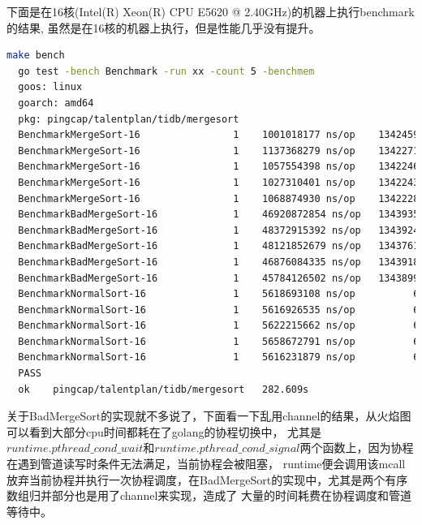 \documentclass[UTF8]{ctexart}
\begin{document}
下面是在16核(Intel(R) Xeon(R) CPU E5620  @ 2.40GHz)的机器上执行benchmark的结果, 虽然是在16核的机器上执行，但是性能几乎没有提升。
\begin{lstlisting}[language=bash]
  make bench
  go test -bench Benchmark -run xx -count 5 -benchmem
  goos: linux
  goarch: amd64
  pkg: pingcap/talentplan/tidb/mergesort
  BenchmarkMergeSort-16       	       1	1001018177 ns/op	134245904 B/op	      79 allocs/op
  BenchmarkMergeSort-16       	       1	1137368279 ns/op	134227152 B/op	      29 allocs/op
  BenchmarkMergeSort-16       	       1	1057554398 ns/op	134224624 B/op	      29 allocs/op
  BenchmarkMergeSort-16       	       1	1027310401 ns/op	134224336 B/op	      30 allocs/op
  BenchmarkMergeSort-16       	       1	1068874930 ns/op	134222896 B/op	      27 allocs/op
  BenchmarkBadMergeSort-16    	       1	46920872854 ns/op	134393560 B/op	     167 allocs/op
  BenchmarkBadMergeSort-16    	       1	48372915392 ns/op	134392440 B/op	     161 allocs/op
  BenchmarkBadMergeSort-16    	       1	48121852679 ns/op	134376152 B/op	     102 allocs/op
  BenchmarkBadMergeSort-16    	       1	46876084335 ns/op	134391896 B/op	     155 allocs/op
  BenchmarkBadMergeSort-16    	       1	45784126502 ns/op	134389944 B/op	     135 allocs/op
  BenchmarkNormalSort-16      	       1	5618693108 ns/op	      64 B/op	       2 allocs/op
  BenchmarkNormalSort-16      	       1	5616926535 ns/op	      64 B/op	       2 allocs/op
  BenchmarkNormalSort-16      	       1	5622215662 ns/op	      64 B/op	       2 allocs/op
  BenchmarkNormalSort-16      	       1	5658672791 ns/op	      64 B/op	       2 allocs/op
  BenchmarkNormalSort-16      	       1	5616231879 ns/op	      64 B/op	       2 allocs/op
  PASS
  ok  	pingcap/talentplan/tidb/mergesort	282.609s
\end{lstlisting}

关于BadMergeSort的实现就不多说了，下面看一下乱用channel的结果，从火焰图可以看到大部分cpu时间都耗在了golang的协程切换中，
尤其是$runtime.pthread\_cond\_wait$和$runtime.pthread\_cond\_signal$两个函数上，因为协程在遇到管道读写时条件无法满足，当前协程会被阻塞，
runtime便会调用该mcall放弃当前协程并执行一次协程调度，在BadMergeSort的实现中，尤其是两个有序数组归并部分也是用了channel来实现，造成了
大量的时间耗费在协程调度和管道等待中。
\end{document}
